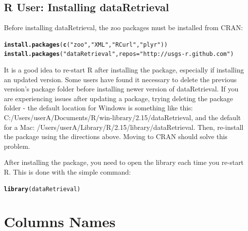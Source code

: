 \documentclass[a4paper,11pt]{article}\usepackage[]{graphicx}\usepackage[]{color}
\makeatletter
\newcommand{\hlstr}[1]{\textcolor[rgb]{0.192,0.494,0.8}{#1}}%
\newcommand{\hlstd}[1]{\textcolor[rgb]{0.345,0.345,0.345}{#1}}%
\newcommand{\hlkwc}[1]{\textcolor[rgb]{0.333,0.667,0.333}{#1}}%
\newcommand{\hlkwd}[1]{\textcolor[rgb]{0.737,0.353,0.396}{\textbf{#1}}}%
\newenvironment{kframe}{%
 \def\at@end@of@kframe{}%
 \ifinner\ifhmode%
  \def\at@end@of@kframe{\end{minipage}}%
  \begin{minipage}{\columnwidth}%
 \fi\fi%
 \def\FrameCommand##1{\hskip\@totalleftmargin \hskip-\fboxsep
 \colorbox{shadecolor}{##1}\hskip-\fboxsep
     \hskip-\linewidth \hskip-\@totalleftmargin \hskip\columnwidth}%
 \MakeFramed {\advance\hsize-\width
   \@totalleftmargin\z@ \linewidth\hsize
   \@setminipage}}%
 {\par\unskip\endMakeFramed%
 \at@end@of@kframe}
\newenvironment{knitrout}{}{} %
\makeatother
\begin{document}
\subsection{R User: Installing dataRetrieval}
Before installing dataRetrieval, the zoo packages must be installed from CRAN:

\begin{knitrout}
\color{fgcolor}\begin{kframe}
\begin{alltt}
\hlkwd{install.packages}\hlstd{(}\hlkwd{c}\hlstd{(}\hlstr{"zoo"}\hlstd{,}\hlstr{"XML"}\hlstd{,}\hlstr{"RCurl"}\hlstd{,}\hlstr{"plyr"}\hlstd{))}
\hlkwd{install.packages}\hlstd{(}\hlstr{"dataRetrieval"}\hlstd{,} \hlkwc{repos}\hlstd{=}\hlstr{"http://usgs-r.github.com"}\hlstd{)}
\end{alltt}
\end{kframe}
\end{knitrout}


It is a good idea to re-start R after installing the package, especially if installing an updated version. Some users have found it necessary to delete the previous version's package folder before installing newer version of dataRetrieval. If you are experiencing issues after updating a package, trying deleting the package folder - the default location for Windows is something like this: C:/Users/userA/Documents/R/win-library/2.15/dataRetrieval, and the default for a Mac: /Users/userA/Library/R/2.15/library/dataRetrieval. Then, re-install the package using the directions above. Moving to CRAN should solve this problem.

After installing the package, you need to open the library each time you re-start R.  This is done with the simple command:
\begin{knitrout}
\color{fgcolor}\begin{kframe}
\begin{alltt}
\hlkwd{library}\hlstd{(dataRetrieval)}
\end{alltt}
\end{kframe}
\end{knitrout}


\section{Columns Names}
\label{sec:appendix2}
\end{document}
